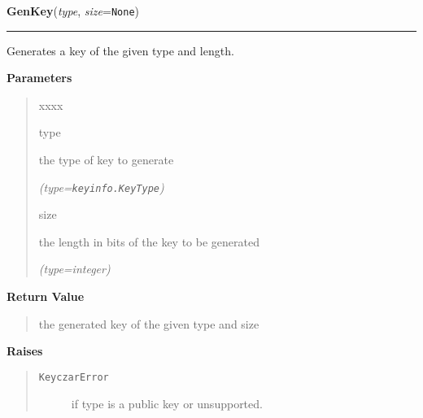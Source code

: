\hspace{.8\funcindent}\begin{boxedminipage}{\funcwidth}

    \raggedright \textbf{GenKey}(\textit{type}, \textit{size}={\tt None})

    \vspace{-1.5ex}

    \rule{\textwidth}{0.5\fboxrule}
\setlength{\parskip}{2ex}
    Generates a key of the given type and length.

\setlength{\parskip}{1ex}
      \textbf{Parameters}
      \vspace{-1ex}

      \begin{quote}
        \begin{Ventry}{xxxx}

          \item[type]

          the type of key to generate

            {\it (type=\texttt{keyinfo.KeyType})}

          \item[size]

          the length in bits of the key to be generated

            {\it (type=integer)}

        \end{Ventry}

      \end{quote}

      \textbf{Return Value}
    \vspace{-1ex}

      \begin{quote}
      the generated key of the given type and size

      \end{quote}

      \textbf{Raises}
    \vspace{-1ex}

      \begin{quote}
        \begin{description}

          \item[\texttt{KeyczarError}]

          if type is a public key or unsupported.

        \end{description}

      \end{quote}

    \end{boxedminipage}

